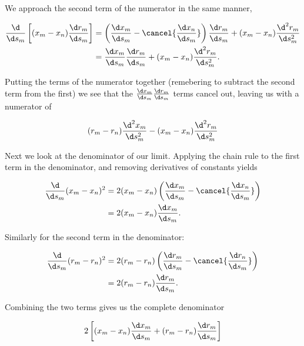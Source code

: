 We approach the second term of the numerator in the same manner,

\begin{equation}
    \begin{aligned}
    \frac{\d}{\d s_m} \left[ (x_m-x_n)\frac{\d r_m}{\d s_m}\right] &= \left(\frac{\d x_m}{\d s_m} - \cancel{\frac{\d x_n}{\d s_m}} \right) \frac{\d r_m}{\d s_m} + (x_m-x_n)\frac{\d^2 r_m}{\d s_m^2}\\
    &= \frac{\d x_m}{\d s_m} \frac{\d r_m}{\d s_m} + (x_m-x_n)\frac{\d^2 r_m}{\d s_m^2}.
    \end{aligned}
\end{equation}

\noindent Putting the terms of the numerator together (remebering to subtract the second term from the first) we see that the \(\frac{\d x_m}{\d s_m} \frac{\d r_m}{\d s_m}\) terms cancel out, leaving us with a numerator of

\begin{equation}
(r_m-r_n)\frac{\d^2 x_m}{\d s_m^2} - (x_m-x_n)\frac{\d^2 r_m}{\d s_m^2}
\end{equation}

Next we look at the denominator of our limit.
Applying the chain rule to the first term in the denominator, and removing derivatives of constants yields

\begin{equation}
    \begin{aligned}
        \frac{\d}{\d s_m} (x_m-x_n)^2 &= 2(x_m-x_n)\left(\frac{\d x_m}{\d s_m}-\cancel{\frac{\d x_n}{\d s_m}}\right)\\
        &= 2(x_m-x_n)\frac{\d x_m}{\d s_m}.
    \end{aligned}
\end{equation}

\noindent Similarly for the second term in the denominator:

\begin{equation}
    \begin{aligned}
        \frac{\d}{\d s_m} (r_m-r_n)^2 &= 2(r_m-r_n)\left(\frac{\d r_m}{\d s_m}-\cancel{\frac{\d r_n}{\d s_m}}\right)\\
        &= 2(r_m-r_n)\frac{\d r_m}{\d s_m}.
    \end{aligned}
\end{equation}

\noindent Combining the two terms gives us the complete denominator

\begin{equation}
    2\left[(x_m-x_n)\frac{\d x_m}{\d s_m} + (r_m-r_n)\frac{\d r_m}{\d s_m}\right]
\end{equation}

